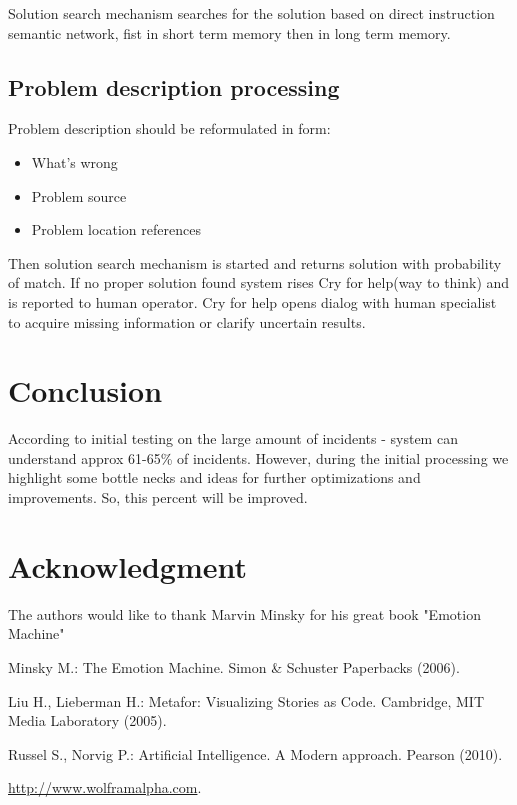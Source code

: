 \documentclass[conference]{IEEEtran}
\begin{document}
Solution search mechanism searches for the solution based on direct instruction semantic network, fist in short term memory then in long term memory.

\subsection{Problem description processing}

Problem description should be reformulated in form:
\begin{itemize}
  \item What's wrong
  \item Problem source
  \item Problem location references
\end{itemize}

Then solution search mechanism is started and returns solution with probability of match. If no proper solution found system rises Cry for help(way to think) and is reported to human operator.
Cry for help opens dialog with human specialist to acquire missing information or clarify uncertain results.

\section{Conclusion}

According to initial testing on the large amount of incidents - system can understand approx 61-65\% of incidents. However, during the initial processing we highlight some bottle necks and ideas for further optimizations and improvements. So, this percent will be improved.

\section*{Acknowledgment}
The authors would like to thank Marvin Minsky for his great book "Emotion Machine" \cite{minsk}

\begin{thebibliography}{4}

Minsky M.:
The Emotion Machine.
Simon \& Schuster Paperbacks  (2006).

Liu H., Lieberman H.:
Metafor: Visualizing Stories as Code.
Cambridge, MIT Media Laboratory  (2005).

Russel S., Norvig P.:
Artificial Intelligence. A Modern approach.
Pearson (2010).

\href{http://www.wolframalpha.com}{http://www.wolframalpha.com}.

\end{thebibliography}
\end{document}
